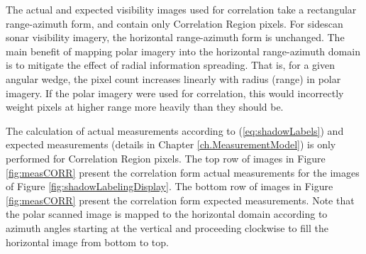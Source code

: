 %

The actual and expected visibility images used for correlation take a rectangular range-azimuth form, and contain only Correlation Region pixels.
For sidescan sonar visibility imagery, the horizontal range-azimuth form is unchanged.
The main benefit of mapping polar imagery into the horizontal range-azimuth domain is to mitigate the effect of radial information spreading.
That is, for a given angular wedge, the pixel count increases linearly with radius (range) in polar imagery.
If the polar imagery were used for correlation, this would incorrectly weight pixels at higher range more heavily than they should be.

The calculation of actual measurements according to (\ref{eq:shadowLabels}) and expected measurements (details in Chapter \ref{ch.MeasurementModel}) is only performed for Correlation Region pixels.
The top row of images in Figure \ref{fig:measCORR} present the correlation form actual measurements for the images of Figure \ref{fig:shadowLabelingDisplay}.
The bottom row of images in Figure \ref{fig:measCORR} present the correlation form expected measurements.
Note that the polar scanned image is mapped to the horizontal domain according to azimuth angles starting at the vertical and proceeding clockwise to fill the horizontal image from bottom to top.

